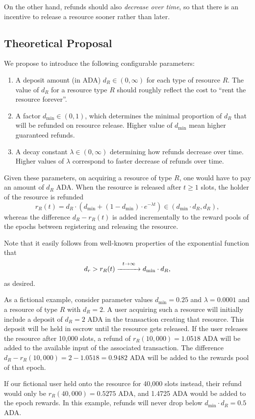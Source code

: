 \documentclass[11pt,a4paper]{article}
\begin{document}
On the other hand, refunds should also \emph{decrease over time}, so that
there is an incentive to release a resource sooner rather than later.

\subsection{Theoretical Proposal}

We propose to introduce the following configurable parameters:
\begin{enumerate}
    \item
        A deposit amount (in ADA) $d_R\in(0,\infty)$ for each type of resource
        $R$. The value of $d_R$ for a resource type $R$ should roughly reflect
        the cost to ``rent the resource forever''.
    \item
        A factor $d_{\min}\in(0,1)$, which determines the minimal proportion of
        $d_R$ that will be refunded on resource release. Higher value of
        $d_{\min}$ mean higher guaranteed refunds.
    \item
        A decay constant $\lambda\in(0,\infty)$ determining how refunds decrease
        over time. Higher values of $\lambda$ correspond to faster decrease of
        refunds over time.
\end{enumerate}

Given these parameters, on acquiring a resource of type $R$, one would have to
pay an amount of $d_R$ ADA\@. When the resource is released after $t\geq 1$ slots,
the holder of the resource is refunded
\[
    r_R(t)=d_R\cdot\left(d_{\min}+(1-d_{\min})\cdot e^{-\lambda t}\right)\in(d_{\min}\cdot d_R,d_R),
\]
whereas the difference $d_R-r_R(t)$ is added incrementally to the reward pools of
the epochs between registering and releasing the resource.

Note that it easily follows from well-known properties of the exponential
function that
\[
    d_r>r_R(t)\stackrel{t\rightarrow\infty}{\xrightarrow{\hspace{10mm}}}d_{\min}\cdot d_R,
\]
as desired.

As a fictional example, consider parameter values $d_{\min}=0.25$ and $\lambda=0.0001$
and a resource of type $R$ with $d_R=2$. A user acquiring such a resource
will initially include a deposit of $d_R=2$ ADA in the transaction creating that
resource. This deposit will be held in escrow until the resource gets released.
If the user releases the resource after 10,000 slots, a refund of
$r_R(10,000)=1.0518$ ADA will be added to the available input of the associated
transaction. The difference $d_R-r_R(10,000)=2-1.0518=0.9482$ ADA will be added
to the rewards pool of that epoch.

If our fictional user held onto the resource for 40,000 slots instead,
their refund would only be $r_R(40,000)=0.5275$ ADA, and 1.4725 ADA
would be added to the epoch rewards. In this example, refunds will
never drop below $d_{\min}\cdot d_R=0.5$ ADA.




\end{document}
